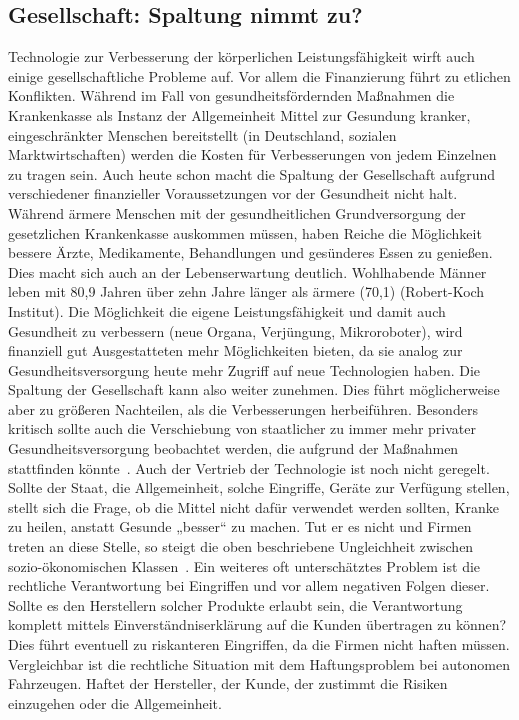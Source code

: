 \documentclass[a4paper,
DIV=13,
12pt,
BCOR=10mm,
department=FakEI,
twoside,
parskip=half,
automark,
]{OTHRartcl}
\begin{document}
\subsection*{Gesellschaft: Spaltung nimmt zu?}
Technologie zur Verbesserung der körperlichen Leistungsfähigkeit wirft auch einige gesellschaftliche Probleme auf. Vor allem die Finanzierung führt zu etlichen Konflikten. Während im Fall von gesundheitsfördernden Maßnahmen die Krankenkasse als
Instanz der Allgemeinheit Mittel zur Gesundung kranker, eingeschränkter Menschen bereitstellt (in Deutschland, sozialen Marktwirtschaften) werden die Kosten für Verbesserungen von jedem Einzelnen zu tragen sein. Auch heute schon macht die Spaltung der
Gesellschaft aufgrund verschiedener finanzieller Voraussetzungen vor der Gesundheit nicht halt. Während ärmere Menschen mit der gesundheitlichen Grundversorgung der gesetzlichen Krankenkasse auskommen müssen, haben Reiche die Möglichkeit bessere Ärzte, Medikamente,
Behandlungen und gesünderes Essen zu genießen. Dies macht sich auch an der Lebenserwartung deutlich. Wohlhabende Männer leben mit 80,9 Jahren über zehn Jahre länger als ärmere (70,1) (Robert-Koch Institut). Die Möglichkeit die eigene Leistungsfähigkeit und damit
auch Gesundheit zu verbessern (neue Organa, Verjüngung, Mikroroboter), wird finanziell gut Ausgestatteten mehr Möglichkeiten bieten, da sie analog zur Gesundheitsversorgung heute mehr Zugriff auf neue Technologien haben. Die Spaltung der Gesellschaft kann also weiter
zunehmen. Dies führt möglicherweise aber zu größeren Nachteilen, als die Verbesserungen herbeiführen. Besonders kritisch sollte auch die Verschiebung von staatlicher zu immer mehr privater Gesundheitsversorgung beobachtet werden, die aufgrund der Maßnahmen stattfinden
könnte~\cite{khan_aziz_2019}. Auch der Vertrieb der Technologie ist noch nicht geregelt. Sollte der Staat, die Allgemeinheit, solche Eingriffe, Geräte zur Verfügung stellen, stellt sich die Frage, ob die Mittel nicht dafür verwendet werden sollten, Kranke zu heilen, anstatt
Gesunde „besser“ zu machen. Tut er es nicht und Firmen treten an diese Stelle, so steigt die oben beschriebene Ungleichheit zwischen sozio-ökonomischen Klassen~\cite{khan_aziz_2019}. Ein weiteres oft unterschätztes Problem ist die rechtliche Verantwortung bei Eingriffen und
vor allem negativen Folgen dieser. Sollte es den Herstellern solcher Produkte erlaubt sein, die Verantwortung komplett mittels Einverständniserklärung auf die Kunden übertragen zu können? Dies führt eventuell zu riskanteren Eingriffen, da die Firmen nicht haften müssen.
Vergleichbar ist die rechtliche Situation mit dem Haftungsproblem bei autonomen Fahrzeugen. Haftet der Hersteller, der Kunde, der zustimmt die Risiken einzugehen oder die Allgemeinheit.
\end{document}
